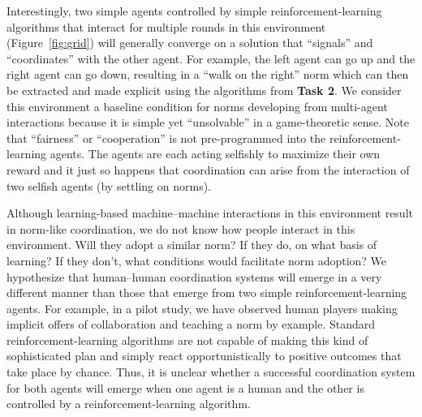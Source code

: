\documentclass[12pt]{article}
\begin{document}

Interestingly, two simple agents controlled by simple
reinforcement-learning algorithms that interact for multiple rounds in
this environment (Figure~\ref{fig:grid}) will generally converge on a
solution that ``signals'' and ``coordinates'' with the other
agent. For example, the left agent can go up and the right agent can
go down, resulting in a ``walk on the right'' norm which can then be
extracted and made explicit using the algorithms from {\bf Task 2}.
We consider this environment a baseline condition for norms developing
from multi-agent interactions because it is simple yet ``unsolvable''
in a game-theoretic sense.  Note that ``fairness'' or ``cooperation''
is not pre-programmed into the reinforcement-learning agents. The
agents are each acting selfishly to maximize their own reward and it
just so happens that coordination can arise from the interaction of
two selfish agents (by settling on norms).


Although learning-based machine--machine interactions in this
environment result in norm-like coordination, we do not know how
people interact in this environment.  Will they adopt a similar norm?
If they do, on what basis of learning?  If they don't, what conditions
would facilitate norm adoption?  We hypothesize that human--human
coordination systems will emerge in a very different manner than those
that emerge from two simple reinforcement-learning agents. For
example, in a pilot study, we have observed human players making
implicit offers of collaboration and teaching a norm by
example. Standard reinforcement-learning algorithms are not capable of
making this kind of sophisticated plan and simply react
opportunistically to positive outcomes that take place by
chance. Thus, it is unclear whether a successful coordination system
for both agents will emerge when one agent is a human and the other is
controlled by a reinforcement-learning algorithm.
\end{document}
